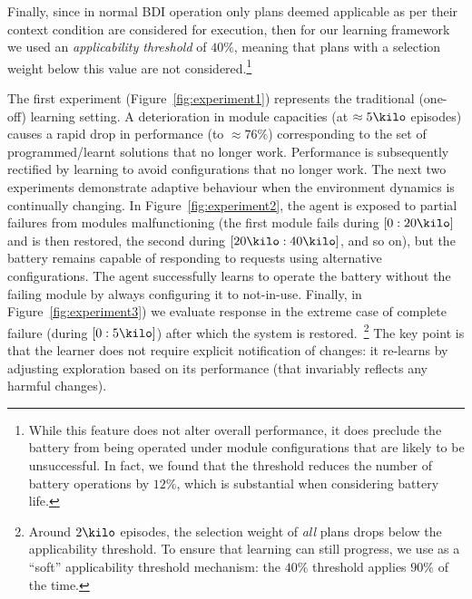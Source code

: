 Finally, since in normal BDI operation only plans deemed applicable as per their context condition are considered for execution, then for our learning framework we used an \emph{applicability threshold} of $40\%$, meaning that plans with a selection weight below this value are not considered.\footnote{While this feature does not alter overall performance, it does preclude the battery from being operated under module configurations that are likely to be unsuccessful. In fact, we found that the threshold reduces the number of battery operations by $12\%$, which is substantial when considering battery life.}

The first experiment (Figure~\ref{fig:experiment1}) represents the traditional (one-off) learning setting. A deterioration in module capacities (at $\approx 5\kilo$ episodes) causes a rapid drop in performance (to $\approx 76\%$) corresponding to the set of programmed/learnt solutions that no longer work. Performance is subsequently rectified by learning to avoid configurations that no longer work. 
%
%
%
The next two experiments demonstrate adaptive behaviour when the environment dynamics is continually changing.
%
In Figure~\ref{fig:experiment2}, the agent is exposed to partial failures from modules malfunctioning (the first module fails during $[0:20\kilo]$ and is then restored, the second during $[20\kilo:40\kilo]$, and so on), but the battery remains capable of responding to requests using alternative configurations. The agent successfully learns to operate the battery without the failing module by always configuring it to not-in-use.
%
Finally, in Figure~\ref{fig:experiment3}) we evaluate response in the extreme case of complete failure (during $[0:5\kilo]$) after which the system is restored.~\footnote{Around $2\kilo$ episodes, the selection weight of {\em all} plans drops below the applicability threshold. To ensure that learning can still progress, we use as a ``soft'' applicability threshold mechanism: the $40\%$ threshold applies $90\%$ of the time.}
%
The key point is that the learner does not require explicit notification of changes: it re-learns by adjusting exploration based on its performance (that invariably reflects any harmful changes).

